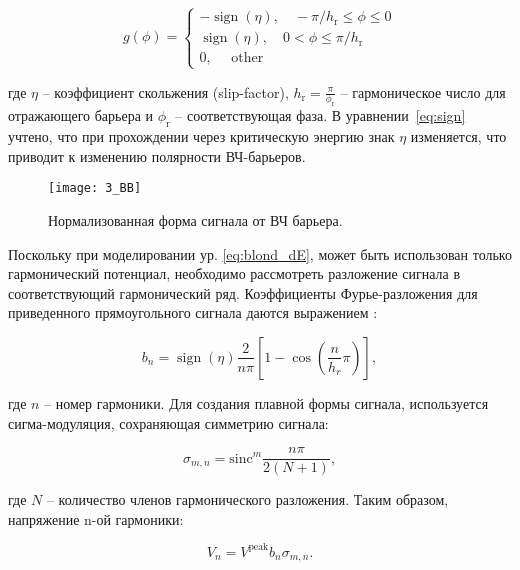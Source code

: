 \begin{equation}
g(\phi)=\left\{\begin{array}{c}
-\operatorname{sign}(\eta),\quad -\pi / h_{\textrm{r}} \leq \phi \leq 0 \\
\operatorname{sign}(\eta),\quad 0<\phi \leq \pi / h_{\textrm{r}} \\
0, \quad \text { other }
\end{array}\right.
\label{eq:sign}
\end{equation}

\noindent где $\eta$ – коэффициент скольжения (slip-factor), $h_{\textrm{r}}=\frac{\pi}{\phi_{\textrm{r}}}$ – гармоническое число для отражающего барьера и $\phi_{\textrm{r}}$ – соответствующая фаза.  В уравнении~\ref{eq:sign} учтено, что при прохождении через критическую энергию знак $\eta$ изменяется, что приводит к изменению полярности ВЧ-барьеров.

\begin{figure}[!h]
  \centering
   \texttt{[image: 3\_BB]}
   \caption{Нормализованная форма сигнала от ВЧ барьера.}
   \label{fig:rf}
\end{figure}

\par Поскольку при моделировании ур. \ref{eq:blond_dE}, может быть использован только гармонический потенциал, необходимо рассмотреть разложение сигнала в соответствующий гармонический ряд. Коэффициенты Фурье-разложения для приведенного прямоугольного сигнала даются выражением \cite{cern:bb}:

\begin{equation}
b_n=\operatorname{sign}{\left(\eta\right)}\frac{2}{n\pi}\left[1-\cos{\left(\frac{n}{h_r}\pi\right)}\right],
\label{b}
\end{equation}

\noindent где $n$ – номер гармоники. Для создания плавной формы сигнала, используется сигма-модуляция, сохраняющая симметрию сигнала:

\begin{equation}
\sigma_{m, n}={\text{sinc}}^m{\frac{n\pi}{2\left(N+1\right)}},
\label{sigma}
\end{equation}

\noindent где $N$ – количество членов гармонического разложения. Таким образом, напряжение n-ой гармоники:

\begin{equation}
V_n=V^{\textrm{peak}}b_n\sigma_{m, n}.
\label{Volt_n}
\end{equation}

